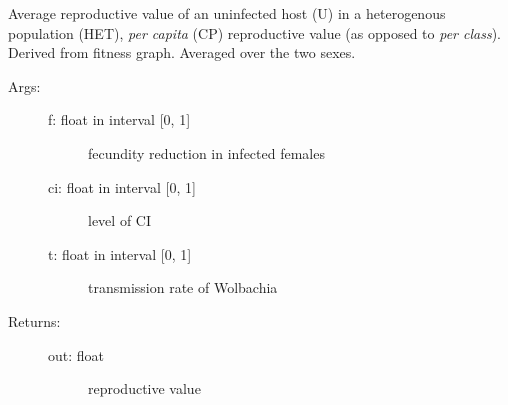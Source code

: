 \documentclass[letterpaper,10pt,english]{sphinxmanual}
\begin{document}
\begin{fulllineitems}
\label{index:wspec.analytical.reproval_UHETCP}
Average reproductive value of an uninfected host (U) in a 
heterogenous population (HET), \emph{per capita} (CP) reproductive 
value (as opposed to \emph{per class}). Derived from fitness graph. 
Averaged over the two sexes.
\begin{description}
\item[{Args:}] \leavevmode\begin{description}
\item[{f: float in interval {[}0, 1{]}}] \leavevmode
fecundity reduction in infected females

\item[{ci: float in interval {[}0, 1{]}}] \leavevmode
level of CI

\item[{t: float in interval {[}0, 1{]}}] \leavevmode
transmission rate of Wolbachia

\end{description}

\item[{Returns:}] \leavevmode\begin{description}
\item[{out: float}] \leavevmode
reproductive value

\end{description}

\end{description}

\end{fulllineitems}

\end{document}
